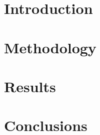 \documentclass{dief_article_class}
\begin{document}
    
    
    \section{Introduction}
    
    
    \section{Methodology}
    

    \section{Results}
    

    \section{Conclusions}
    

    
    
\end{document}
